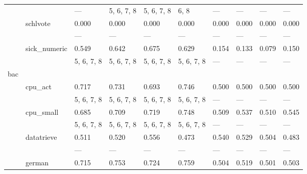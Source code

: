 \documentclass{article}
\begin{document}
\begin{center}
\begin{longtable}{p{1.2cm}p{1.8cm}p{1cm}p{1cm}p{1cm}p{1cm}p{1cm}p{1cm}p{1cm}p{1cm}}
             &              & ---              & 5, 6, 7, 8    & 5, 6, 7, 8    & 6, 8          & ---           & ---        & ---              & ---           \\
             & schlvote     & 0.000            & 0.000         & 0.000         & 0.000         & 0.000         & 0.000      & 0.000            & 0.000         \\
             &              & ---              & ---           & ---           & ---           & ---           & ---        & ---              & ---           \\
             & sick\_numeric & 0.549            & 0.642         & 0.675         & 0.629         & 0.154         & 0.133      & 0.079            & 0.150         \\
             &              & 5, 6, 7, 8       & 5, 6, 7, 8    & 5, 6, 7, 8    & 5, 6, 7, 8    & ---           & ---        & ---              & ---           \\
 bac         &              &                  &               &               &               &               &            &                  &               \\
             & cpu\_act      & 0.717            & 0.731         & 0.693         & 0.746         & 0.500         & 0.500      & 0.500            & 0.500         \\
             &              & 5, 6, 7, 8       & 5, 6, 7, 8    & 5, 6, 7, 8    & 5, 6, 7, 8    & ---           & ---        & ---              & ---           \\
             & cpu\_small    & 0.685            & 0.709         & 0.719         & 0.748         & 0.509         & 0.537      & 0.510            & 0.545         \\
             &              & 5, 6, 7, 8       & 5, 6, 7, 8    & 5, 6, 7, 8    & 5, 6, 7, 8    & ---           & ---        & ---              & ---           \\
             & datatrieve   & 0.511            & 0.520         & 0.556         & 0.473         & 0.540         & 0.529      & 0.504            & 0.483         \\
             &              & ---              & ---           & ---           & ---           & ---           & ---        & ---              & ---           \\
             & german       & 0.715            & 0.753         & 0.724         & 0.759         & 0.504         & 0.519      & 0.501            & 0.503         \\

\end{longtable}
\end{center}
\end{document}

